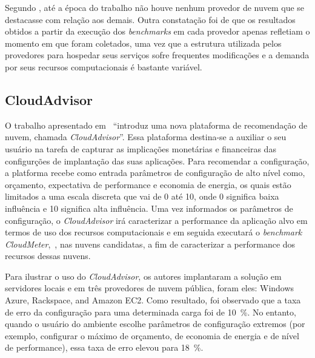Segundo , até a época do trabalho não houve
nenhum provedor de nuvem que se destacasse com relação aos demais. Outra constatação foi de que os resultados
obtidos a partir da execução dos {\em benchmarks} em cada provedor apenas refletiam o momento em que foram coletados, uma vez que a estrutura utilizada pelos provedores para hospedar seus serviços sofre frequentes modificações e a demanda por seus recursos computacionais é bastante variável.


\subsection{CloudAdvisor}
O trabalho apresentado em~\cite{jung2013cloudadvisor} ``introduz uma nova plataforma de recomendação de nuvem, chamada {\em CloudAdvisor}''. Essa plataforma destina-se a auxiliar o seu usuário na tarefa de capturar as implicações monetárias e financeiras das configurções de implantação das suas aplicações. Para recomendar a configuração, a platforma recebe como entrada parâmetros de configuração de alto nível como, orçamento, expectativa de performance e economia de energia, os quais estão limitados a uma escala discreta que vai de 0 até 10, onde 0 significa baixa influência e 10 significa alta influência. Uma vez informados os parâmetros de configuração, o {\em CloudAdvisor} irá caracterizar a performance da aplicação alvo em termos de uso dos recursos computacionais e em seguida executará o {\em benchmark} {\em CloudMeter},~\cite{jung2013cloudadvisor}, nas nuvens candidatas, a fim de caracterizar a performance dos recursos dessas nuvens.

Para ilustrar o uso do {\em CloudAdvisor}, os autores implantaram a solução em servidores locais e em três provedores de nuvem pública, foram eles: Windows Azure, Rackspace, and Amazon EC2. Como resultado, foi observado que a taxa de erro da configuração para uma determinada carga foi de 10~\%. No entanto, quando o usuário do ambiente escolhe parâmetros de configuração extremos (por exemplo, configurar o máximo de orçamento, de economia de energia e de nível de performance), essa taxa de erro elevou para 18~\%.

